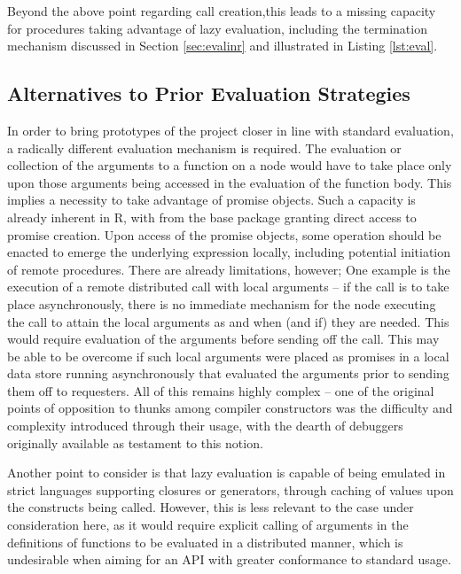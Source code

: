 Beyond the above point regarding call creation,this leads to a missing capacity for procedures taking advantage of lazy evaluation, including the termination mechanism discussed in Section \cref{sec:evalinr} and illustrated in Listing \cref{lst:eval}.

\subsection{Alternatives to Prior Evaluation Strategies}

In order to bring prototypes of the project closer in line with standard \R evaluation, a radically different evaluation mechanism is required.
The evaluation or collection of the arguments to a function on a node would have to take place only upon those arguments being accessed in the evaluation of the function body.
This implies a necessity to take advantage of promise objects.
Such a capacity is already inherent in R, with  from the base package granting direct access to promise creation.
Upon access of the promise objects, some operation should be enacted to emerge the underlying expression locally, including potential initiation of remote procedures.
There are already limitations, however;
One example is the execution of a remote distributed call with local arguments -- if the call is to take place asynchronously, there is no immediate mechanism for the node executing the call to attain the local arguments as and when (and if) they are needed.
This would require evaluation of the arguments before sending off the call.
This may be able to be overcome if such local arguments were placed as promises in a local data store running asynchronously that evaluated the arguments prior to sending them off to requesters.
All of this remains highly complex -- one of the original points of opposition to thunks \cite{ingerman1961thunks}among compiler constructors was the difficulty and complexity introduced through their usage, with the dearth of debuggers originally available as testament to this notion.

Another point to consider is that lazy evaluation is capable of being emulated in strict languages supporting closures or generators, through caching of values upon the constructs being called.
However, this is less relevant to the case under consideration here, as it would require explicit calling of arguments in the definitions of functions to be evaluated in a distributed manner, which is undesirable when aiming for an API with greater conformance to standard \R usage.

